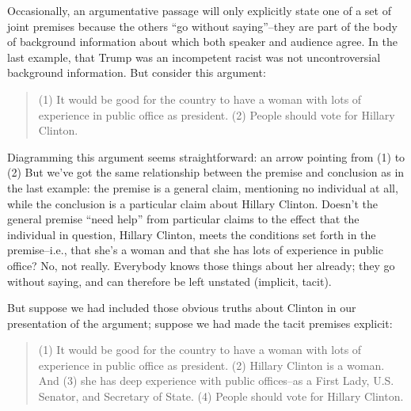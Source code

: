 Occasionally, an argumentative passage will only explicitly state one of a set of joint premises
because the others ``go without saying''--they are part of the body of background information
about which both speaker and audience agree. In the last example, that Trump was an incompetent
racist was not uncontroversial background information. But consider this argument:

\begin{quote}
(1) It would be good for the country to have a woman with lots of experience in public
office as president. (2) People should vote for Hillary Clinton.
\end{quote}

Diagramming this argument seems straightforward: an arrow pointing from (1) to (2) But we've
got the same relationship between the premise and conclusion as in the last example: the premise
is a general claim, mentioning no individual at all, while the conclusion is a particular claim about
Hillary Clinton. Doesn't the general premise ``need help'' from particular claims to the effect that
the individual in question, Hillary Clinton, meets the conditions set forth in the premise--i.e., that
she's a woman and that she has lots of experience in public office? No, not really. Everybody
knows those things about her already; they go without saying, and can therefore be left unstated
(implicit, tacit).

But suppose we had included those obvious truths about Clinton in our presentation of the
argument; suppose we had made the tacit premises explicit:

\begin{quote}
(1) It would be good for the country to have a woman with lots of experience in public
office as president. (2) Hillary Clinton is a woman. And (3) she has deep experience with
public offices--as a First Lady, U.S. Senator, and Secretary of State. (4) People should vote
for Hillary Clinton.
\end{quote}


